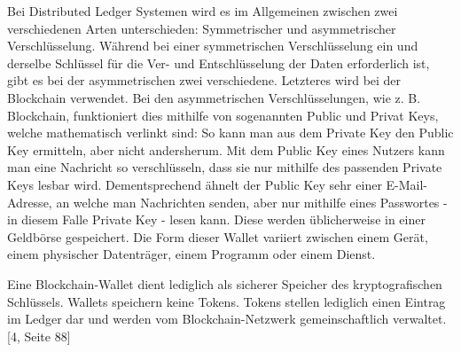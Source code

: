 Bei Distributed Ledger Systemen wird es im Allgemeinen zwischen zwei verschiedenen Arten unterschieden: Symmetrischer und asymmetrischer Verschlüsselung.
Während bei einer symmetrischen Verschlüsselung ein und derselbe Schlüssel für die Ver- und Entschlüsselung der Daten erforderlich ist, gibt es bei der asymmetrischen zwei verschiedene.
Letzteres wird bei der Blockchain verwendet.
Bei den asymmetrischen Verschlüsselungen, wie z. B. Blockchain, funktioniert dies mithilfe von sogenannten Public und Privat Keys, welche mathematisch verlinkt sind: So kann man aus dem Private Key den Public Key ermitteln, aber nicht andersherum.
Mit dem Public Key eines Nutzers kann man eine Nachricht so verschlüsseln, dass sie nur mithilfe des passenden Private Keys lesbar wird.
Dementsprechend ähnelt der Public Key sehr einer E-Mail-Adresse, an welche man Nachrichten senden, aber nur mithilfe eines Passwortes - in diesem Falle Private Key - lesen kann. Diese werden üblicherweise in einer Geldbörse gespeichert.
Die Form dieser Wallet variiert zwischen einem Gerät, einem physischer Datenträger, einem Programm oder einem Dienst.

Eine Blockchain-Wallet dient lediglich als sicherer Speicher des kryptografischen Schlüssels.
Wallets speichern keine Tokens.
Tokens stellen lediglich einen Eintrag im Ledger dar und werden vom Blockchain-Netzwerk gemeinschaftlich verwaltet. [4, Seite 88]



